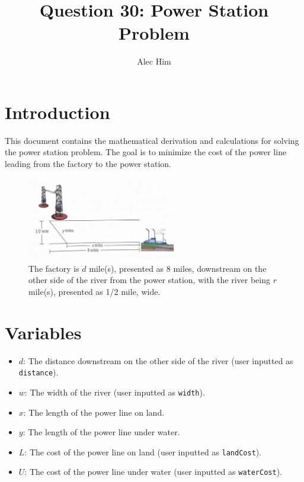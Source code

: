 \documentclass{article}
\title{Question 30: Power Station Problem}
\author{Alec Him}
\date{}
\begin{document}
\maketitle


\section{Introduction}
This document contains the mathematical derivation and calculations for solving the power station problem. The goal is to minimize the cost of the power line leading from the factory to the power station. 
\begin{figure}[h!]
    \centering
    \includegraphics[width=0.6\textwidth]{Figure1.pdf}
    \caption{The factory is \( d \) mile(s), presented as 8 miles, downstream on the other side of the river from the power station, with the river being \( r \) mile(s), presented as 1/2 mile, wide.}
    \label{fig.Graph}
\end{figure}


\section{Variables}
\begin{itemize}
    \item \( d \): The distance downstream on the other side of the river (user inputted as \texttt{distance}).
    \item \( w \): The width of the river (user inputted as \texttt{width}).
    \item \( x \): The length of the power line on land.
    \item \( y \): The length of the power line under water.
    \item \( L \): The cost of the power line on land (user inputted as \texttt{landCost}).
    \item \( U \): The cost of the power line under water (user inputted as \texttt{waterCost}).
\end{itemize}
\end{document}
